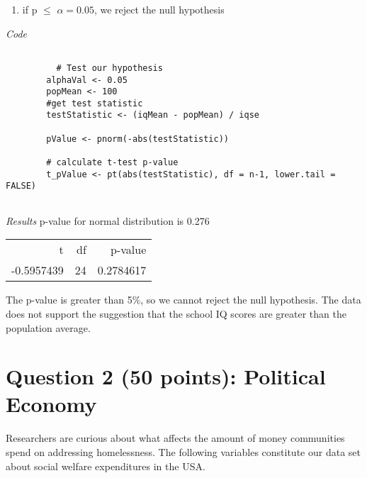 \documentclass[12pt,letterpaper]{article}
\begin{document}
\begin{enumerate}
\begin{enumerate}
		    \item if p $\le$ $\alpha=0.05$, we reject the null hypothesis
		    
		  \end{enumerate}
		  
		  \noindent

      \emph{Code}
		  \begin{verbatim} 

  		  # Test our hypothesis
        alphaVal <- 0.05
        popMean <- 100
        #get test statistic
        testStatistic <- (iqMean - popMean) / iqse
                  
        pValue <- pnorm(-abs(testStatistic))

        # calculate t-test p-value 
        t_pValue <- pt(abs(testStatistic), df = n-1, lower.tail = FALSE)


		  \end{verbatim} 

      \emph{Results}
		  p-value for normal distribution is 0.276

\begin{tabular}{r|r|r}
          t & df  & p-value\\
 -0.5957439 &24 &0.2784617\\
\end{tabular}
        The p-value is greater than 5\%, so we cannot reject the null hypothesis. 
        The data does not support the suggestion that the school IQ scores are greater than the 
        population average.




	\end{enumerate}
	
	\newpage
	
	\section*{Question 2 (50 points): Political Economy}
	
	\noindent Researchers are curious about what affects the amount of money communities spend on addressing homelessness. The following variables constitute our data set about social welfare expenditures in the USA. \\
	\vspace{.5cm}
	\begin{comment}
	\texttt{[image: example-image-a4-numbered]}
\texttt{[image: example-image-a4-numbered]}
\texttt{[image: example-image-a4-numbered]}

	\end{comment}
	
\end{document}
